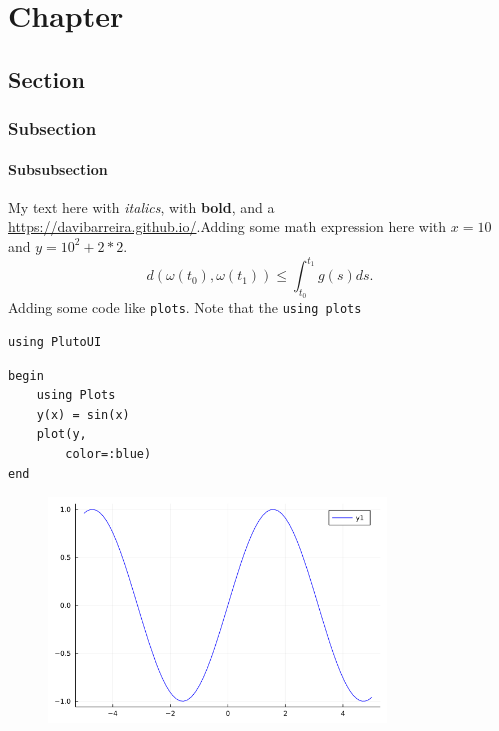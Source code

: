 \newpage

\chapter{Chapter}

\section{Section}

\subsection{Subsection}

\subsubsection{Subsubsection}
My text here with \textit{italics}, with \textbf{bold}, and a \href{link}{https://davibarreira.github.io/}.Adding some math expression here with $x=10$ and $y = 10^2 + 2*2$.
\begin{displaymath}
	d(\omega(t_0),\omega(t_1)) \leq \int^{t_1}_{t_0}g(s) ds.
\end{displaymath}
Adding some code like \lstinline[style=julia]{plots}. Note that the \lstinline[style=julia]{using plots}
\begin{lstlisting}[language=JuliaLocal, style=julia]
using PlutoUI
\end{lstlisting}

\begin{lstlisting}[language=JuliaLocal, style=julia]
begin
	using Plots
	y(x) = sin(x)
	plot(y,
		color=:blue)
end
\end{lstlisting}

\begin{figure}[H]
	\centering
	\includegraphics[width=0.8\textwidth]{./figures/examplepluto_figure1.png}
	\label{fig:examplepluto_figure1.png}

\end{figure}

